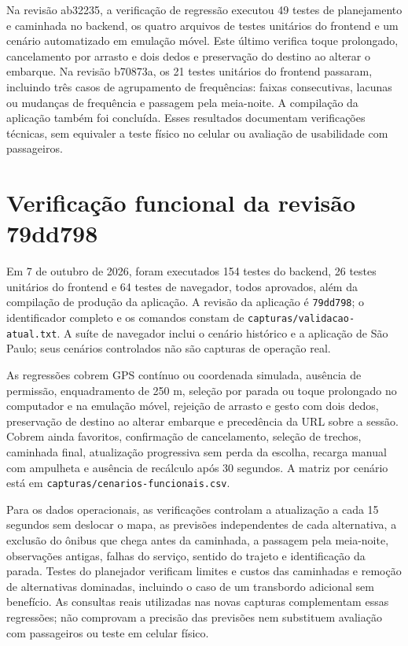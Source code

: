 Na revisão ab32235, a verificação de regressão executou 49 testes de planejamento e caminhada no backend, os quatro arquivos de testes unitários do frontend e um cenário automatizado em emulação móvel. Este último verifica toque prolongado, cancelamento por arrasto e dois dedos e preservação do destino ao alterar o embarque. Na revisão b70873a, os 21 testes unitários do frontend passaram, incluindo três casos de agrupamento de frequências: faixas consecutivas, lacunas ou mudanças de frequência e passagem pela meia-noite. A compilação da aplicação também foi concluída. Esses resultados documentam verificações técnicas, sem equivaler a teste físico no celular ou avaliação de usabilidade com passageiros.

\section{Verificação funcional da revisão 79dd798}
Em 7 de outubro de 2026, foram executados 154 testes do backend, 26 testes unitários do frontend e 64 testes de navegador, todos aprovados, além da compilação de produção da aplicação. A revisão da aplicação é \texttt{79dd798}; o identificador completo e os comandos constam de \nolinkurl{capturas/validacao-atual.txt}. A suíte de navegador inclui o cenário histórico e a aplicação de São Paulo; seus cenários controlados não são capturas de operação real.

As regressões cobrem GPS contínuo ou coordenada simulada, ausência de permissão, enquadramento de 250 m, seleção por parada ou toque prolongado no computador e na emulação móvel, rejeição de arrasto e gesto com dois dedos, preservação de destino ao alterar embarque e precedência da URL sobre a sessão. Cobrem ainda favoritos, confirmação de cancelamento, seleção de trechos, caminhada final, atualização progressiva sem perda da escolha, recarga manual com ampulheta e ausência de recálculo após 30 segundos. A matriz por cenário está em \nolinkurl{capturas/cenarios-funcionais.csv}.

Para os dados operacionais, as verificações controlam a atualização a cada 15 segundos sem deslocar o mapa, as previsões independentes de cada alternativa, a exclusão do ônibus que chega antes da caminhada, a passagem pela meia-noite, observações antigas, falhas do serviço, sentido do trajeto e identificação da parada. Testes do planejador verificam limites e custos das caminhadas e remoção de alternativas dominadas, incluindo o caso de um transbordo adicional sem benefício. As consultas reais utilizadas nas novas capturas complementam essas regressões; não comprovam a precisão das previsões nem substituem avaliação com passageiros ou teste em celular físico.

